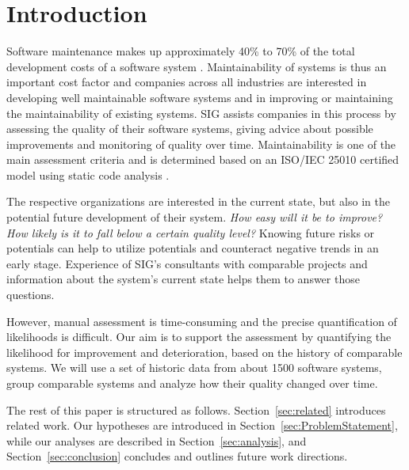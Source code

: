 \section{Introduction}
Software maintenance makes up approximately 40\% to 70\% of the total development costs of a software system \cite{grubb2003software}.
Maintainability of systems is thus an important cost factor and companies across all industries are interested in developing well maintainable software systems and in improving or maintaining the maintainability of existing systems.
SIG assists companies in this process by assessing the quality of their software systems, giving advice about possible improvements and monitoring of quality over time.
Maintainability is one of the main assessment criteria and is determined based on an ISO/IEC 25010 certified model using static code analysis \cite{heitlager2007practical}.

The respective organizations are interested in the current state, but also in the potential future development of their system.
\textit{How easy will it be to improve?} \textit{How likely is it to fall below a certain quality level?} Knowing future risks or potentials can help to utilize potentials and counteract negative trends in an early stage.
Experience of SIG's consultants with comparable projects and information about the system's current state helps them to answer those questions. 

However, manual assessment is time-consuming and the precise quantification of likelihoods is difficult.
Our aim is to support the assessment by quantifying the likelihood for improvement and deterioration, based on the history of comparable systems.
We will use a set of historic data from about 1500 software systems, group comparable systems and analyze how their quality changed over time.

The rest of this paper is structured as follows.
Section~\ref{sec:related} introduces related work.
Our hypotheses are introduced in Section~\ref{sec:ProblemStatement}, while our analyses are described in Section~\ref{sec:analysis}, and Section~\ref{sec:conclusion} concludes and outlines future work directions.

